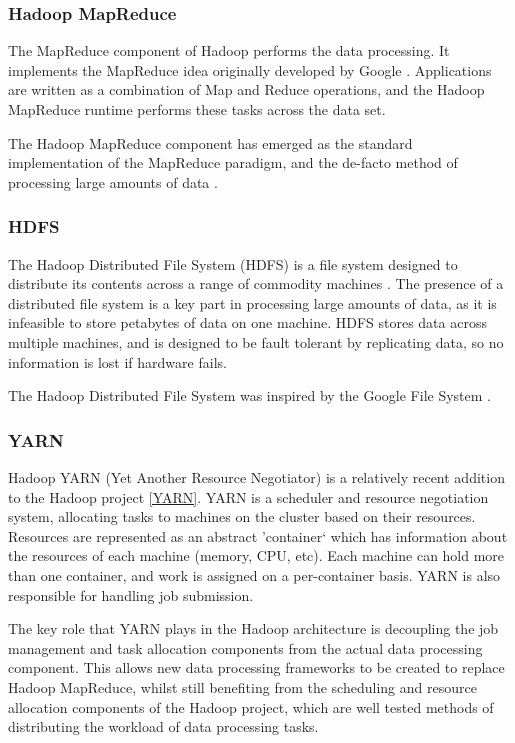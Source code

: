 \subsubsection{Hadoop MapReduce}
The MapReduce component of Hadoop performs the data processing. It implements the MapReduce idea originally developed by Google \cite{dean2004mapreduce}. Applications are written as a combination of Map and Reduce operations, and the Hadoop MapReduce runtime performs these tasks across the data set.

The Hadoop MapReduce component has emerged as the standard implementation of the MapReduce paradigm, and the de-facto method of processing large amounts of data \cite{qin2013reflection}.  

\subsubsection{HDFS}
The Hadoop Distributed File System (HDFS) is a file system designed to distribute its contents across a range of commodity machines \cite{borthakur2007hadoop}. The presence of a distributed file system is a key part in processing large amounts of data, as it is infeasible to store petabytes of data on one machine. HDFS stores data across multiple machines, and is designed to be fault tolerant by replicating data, so no information is lost if hardware fails. 

The Hadoop Distributed File System was inspired by the Google File System \cite{ghemawat2003google}.

\subsubsection{YARN}
Hadoop YARN (Yet Another Resource Negotiator) is a relatively recent addition to the Hadoop project \ref{YARN}. YARN is a scheduler and resource negotiation system, allocating tasks to machines on the cluster based on their resources. Resources are represented as an abstract 'container` which has information about the resources of each machine (memory, CPU, etc). Each machine can hold more than one container, and work is assigned on a per-container basis. YARN is also responsible for handling job submission. 

The key role that YARN plays in the Hadoop architecture is decoupling the job management and task allocation components from the actual data processing component. This allows new data processing frameworks to be created to replace Hadoop MapReduce, whilst still benefiting from the scheduling and resource allocation components of the Hadoop project, which are well tested methods of distributing the workload of data processing tasks.

